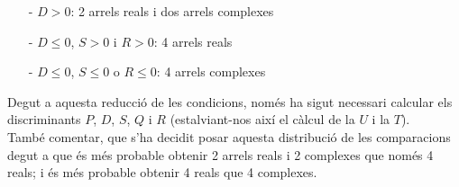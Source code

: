 \documentclass[a4paper, 11pt]{article}
\begin{document}
\begin{itemize}
    \item [-] $D > 0$: 2 arrels reals i dos arrels complexes
    \item [-] $D \leq 0$, $S > 0$ i $R > 0$: 4 arrels reals
    \item [-] $D \leq 0$, $S \leq 0$ o $R \leq 0$: 4 arrels complexes
\end{itemize}
Degut a aquesta reducció de les condicions, només ha sigut necessari calcular els discriminants $P$, $D$, $S$, $Q$ i $R$ (estalviant-nos així el càlcul de la $U$ i la $T$).
\\
També comentar, que s'ha decidit posar aquesta distribució de les comparacions degut a que és més probable obtenir 2 arrels reals i 2 complexes que només 4 reals; i és més probable obtenir 4 reals que 4 complexes.


\newpage
\end{document}

